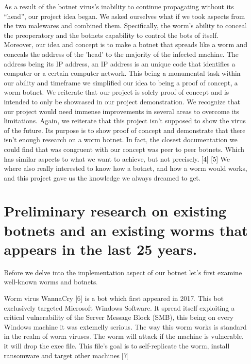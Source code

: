 \documentclass[../main.tex]{subfiles}
\begin{document}
    As a result of the botnet virus's inability to continue propagating without its “head”, our project idea began. 
    We asked ourselves what if we took aspects from the two malewares and combined them. 
    Specifically, the worm's ability to conceal the preoperatory and the botnets capability to control the bots of itself. 
    Moreover, our idea and concept is to make a botnet that spreads like a worm and conceals the address of the 'head' to the majority of the infected machine. 
    The address being its IP address, an IP address is an unique code that identifies a computer or a certain computer network. 
    This being a monumental task within our ability and timeframe we simplified our idea to being a proof of concept, a worm botnet. 
    We reiterate that our project is solely proof of concept and is intended to only be showcased in our project demonstration. 
    We recognize that our project would need immense improvements in several areas to overcome its limitations. 
    Again, we reiterate that this project isn't supposed to show the virus of the future. 
    Its purpose is to show proof of concept and demonstrate that there isn't enough research on a worm botnet. 
    In fact, the closest documentation we could find that was congruent with our concept was peer to peer botnets. 
    Which has similar aspects to what we want to achieve, but not precisely. [4] [5] 
    We where also really interested to know how a botnet, and how a worm would works, and this project gave us the knowledge we always dreamed to get.


	\vspace{10pt}
    
    \section{Preliminary research on existing botnets and an existing worms that appears in the last 25 years.}

Before we delve into the implementation aspect of our botnet let's first examine well-known worms and botnets.  

Worm virus WannaCry [6] is a bot which first appeared in 2017.
This bot exclusively targeted Microsoft Windows Software. 
It spread itself exploiting a critical vulnerability of the Server Message Block (SMB), this being on every Windows machine it was extemelly serious. 
The way this worm works is standard in the realm of worm viruses. 
The worm will attack if the machine is vulnerable, it will drop the exec file. 
This file's goal is to self-replicate the worm, install ransomware and target other machines [7] 
\end{document}

